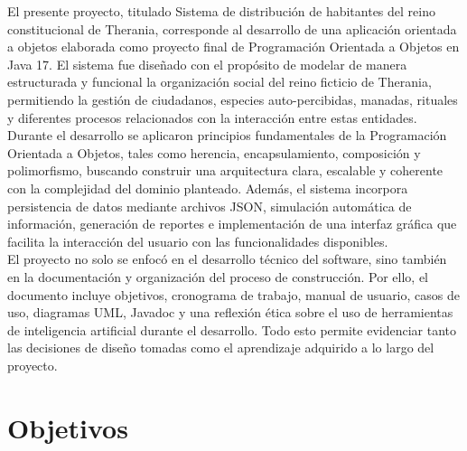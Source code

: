 \documentclass[man]{apa7}
\begin{document}
	El presente proyecto, titulado Sistema de distribución de habitantes del reino constitucional de Therania, corresponde al desarrollo de una aplicación orientada a objetos elaborada como proyecto final de Programación Orientada a Objetos en Java 17. El sistema fue diseñado con el propósito de modelar de manera estructurada y funcional la organización social del reino ficticio de Therania, permitiendo la gestión de ciudadanos, especies auto-percibidas, manadas, rituales y diferentes procesos relacionados con la interacción entre estas entidades. \\
	Durante el desarrollo se aplicaron principios fundamentales de la Programación Orientada a Objetos, tales como herencia, encapsulamiento, composición y polimorfismo, buscando construir una arquitectura clara, escalable y coherente con la complejidad del dominio planteado. Además, el sistema incorpora persistencia de datos mediante archivos JSON, simulación automática de información, generación de reportes e implementación de una interfaz gráfica que facilita la interacción del usuario con las funcionalidades disponibles.\\
	El proyecto no solo se enfocó en el desarrollo técnico del software, sino también en la documentación y organización del proceso de construcción. Por ello, el documento incluye objetivos, cronograma de trabajo, manual de usuario, casos de uso, diagramas UML, Javadoc y una reflexión ética sobre el uso de herramientas de inteligencia artificial durante el desarrollo. Todo esto permite evidenciar tanto las decisiones de diseño tomadas como el aprendizaje adquirido a lo largo del proyecto.
	
	\vspace*{\fill}
	
	\newpage
	
	\section*{Objetivos}\label{sec:Objetivos}
	
	\vspace*{\fill}
	
\end{document}
